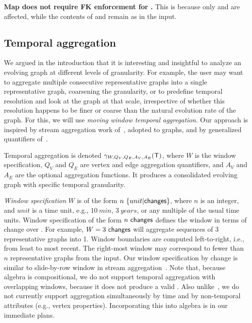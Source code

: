 {\bf Map does not require FK enforcement for \tve.}  This is because
only \tav and \tae are affected, while the contents of \tv and \te
remain as in the input.

\subsection{Temporal aggregation}
\label{sec:algebra:agg}

We argued in the introduction that it is interesting and insightful to
analyze an evolving graph at different levels of granularity.  For
example, the user may want to aggregate multiple consecutive
representative graphs into a single representative graph, coarsening
the granularity, or to predefine temporal resolution and look at the
graph at that scale, irrespective of whether this resolution happens
to be finer or coarse than the natural evolution rate of the graph.
For this, we will use {\em moving window temporal aggregation}.  Our
approach is inspired by stream aggregation work of~\cite{Li2005},
adopted to graphs, and by generalized quantifiers of~\cite{Hsu1995}.

Temporal aggregation is denoted $\gamma_{W,Q_V,Q_E,A_V,A_E} (\mathsf{T})$,
where $W$ is the window specification, $Q_V$ and $Q_E$ are vertex and
edge aggregation quantifiers, and $A_V$ and $A_E$ are the optional
aggregation functions.  It produces a consolidated evolving graph with
specific temporal granularity.

{\em Window specification} $W$ is of the form
$n~\{unit|\textsf{changes}\}$, where $n$ is an integer, and $unit$ is a
time unit, e.g., $10~min$, $3~years$, or any multiple of the usual
time units.  Window specification of the form $n~\textsf{changes}$
defines the window in terms of change over \trg.  For example,
$W=3~\textsf{changes}$ will aggregate sequences of 3 representative
graphs into 1.  Window boundaries are computed left-to-right, i.e.,
from least to most recent.  The right-most window may correspond to
fewer than $n$ representative graphs from the input.
%
Our window specification by change is similar to slide-by-row window
in stream aggregation~\cite{Li2005}.  Note that, because \tg algebra
is compositional, we do not support temporal aggregation with
overlapping windows, because it does not produce a valid \tg. Also
unlike~\cite{Li2005}, we do not currently support aggregation
simultaneously by time and by non-temporal attributes (e.g., vertex
properties). Incorporating this into \tg algebra is in our immediate
plans.

